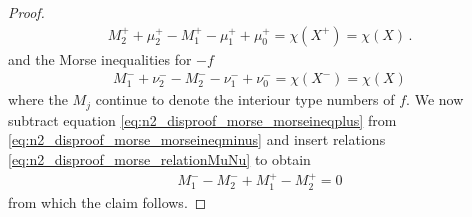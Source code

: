 \begin{proof}
  \begin{align}
    M_2^++\mu^+_2-M_1^+-\mu^+_1+\mu^+_0=\chi(X^+)=\chi(X)\,.\label{eq:n2_disproof_morse_morseineqplus}
  \end{align}
  and the Morse inequalities for $-f$
  \begin{align}
    M_1^-+\nu^-_2-M_2^--\nu^-_1+\nu^-_0=\chi(X^-)=\chi(X)\label{eq:n2_disproof_morse_morseineqminus}
  \end{align}
  where the $M_j$ continue to denote the interiour type numbers of $f$.
  We now subtract equation \eqref{eq:n2_disproof_morse_morseineqplus} from \eqref{eq:n2_disproof_morse_morseineqminus}
  and insert relations \eqref{eq:n2_disproof_morse_relationMuNu} to obtain
  \begin{align*}
    M_1^--M_2^-+M_1^+-M_2^+=0
  \end{align*}
  from which the claim follows.
\end{proof}

